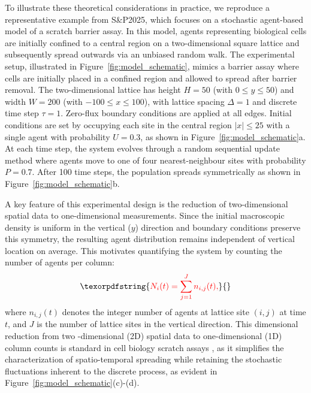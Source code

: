 \documentclass{article}
\providecommand{\DIFdeltex}[1]{{\protect\color{red} \scriptsize #1}} %
\providecommand{\DIFdel}[1]{\texorpdfstring{\DIFdeltex{#1}}{}} %
\begin{document}
\DIFdel{To illustrate these theoretical considerations in practice, we reproduce a representative example from S\&P2025, which focuses on a stochastic agent-based model of a scratch barrier assay. In this model, agents representing biological cells are initially confined to a central region on a two-dimensional square lattice and subsequently spread outwards via an unbiased random walk. The experimental setup, illustrated in Figure~\ref{fig:model_schematic}, mimics a barrier assay where cells are initially placed in a confined region and allowed to spread after barrier removal. The two-dimensional lattice has height $H=50$ (with $0\leq y \leq 50$) and width $W=200$ (with $-100 \leq x \leq 100$), with lattice spacing $\Delta=1$ and discrete time step $\tau=1$. Zero-flux boundary conditions are applied at all edges. Initial conditions are set by occupying each site in the central region $|x| \leq 25$ with a single agent with probability $U=0.3$, as shown in Figure~\ref{fig:model_schematic}a. At each time step, the system evolves through a random sequential update method where agents move to one of four nearest-neighbour sites with probability $P=0.7$. After 100 time steps, the population spreads symmetrically as shown in Figure~\ref{fig:model_schematic}b.
}%

\DIFdel{A key feature of this experimental design is the reduction of two-dimensional spatial data to one-dimensional measurements. Since the initial macroscopic density is uniform in the vertical ($y$) direction and boundary conditions preserve this symmetry, the resulting agent distribution remains independent of vertical location on average. This motivates quantifying the system by counting the number of agents per column:
}\begin{displaymath}
	\DIFdel{N_i(t) = \sum_{j=1}^{J} n_{i,j}(t),
}\end{displaymath}%
\DIFdel{where $n_{i,j}(t)$ denotes the integer number of agents at lattice site $(i,j)$ at time $t$, and $J$ is the number of lattice sites in the vertical direction. This dimensional reduction from two -dimensional (2D) spatial data to one-dimensional (1D) column counts is standard in cell biology scratch assays \citep{Jin2016}, as it simplifies the characterization of spatio-temporal spreading while retaining the stochastic fluctuations inherent to the discrete process, as evident in Figure~\ref{fig:model_schematic}(c)-(d).
}%
\end{document}
